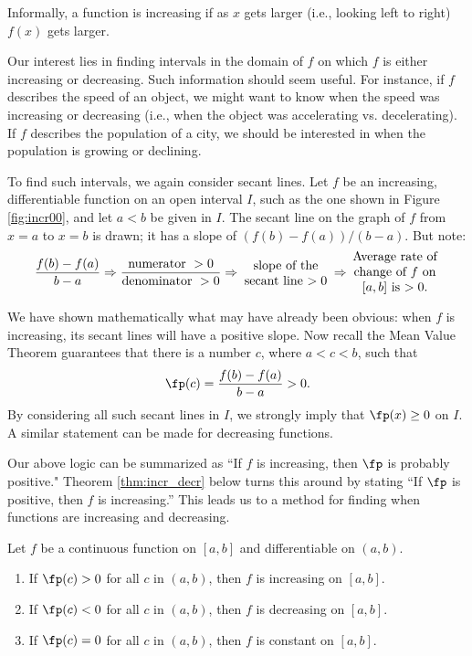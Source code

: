 Informally, a function is increasing if as $x$ gets larger (i.e., looking left to right) $f(x)$ gets larger.

Our interest lies in finding intervals in the domain of $f$ on which $f$ is either increasing or decreasing. Such information should seem useful. For instance, if $f$ describes the speed of an object, we might want to know when the speed was increasing or decreasing (i.e., when the object was accelerating vs. decelerating). If $f$ describes the population of a city, we should be interested in when the population is growing or declining.

To find such intervals, we again consider secant lines. Let $f$ be an increasing, differentiable function on an open interval $I$, such as the one shown in Figure \ref{fig:incr00}, and let $a<b$ be given in $I$. The secant line on the graph of $f$ from $x=a$ to $x=b$ is drawn; it has a slope of $(f(b)-f(a))/(b-a)$. But note:
\[
\frac{f(b)-f(a)}{b-a} \Rightarrow \frac{\text{numerator }>0}{\text{denominator } >0} \Rightarrow \parbox{70pt}{\centering slope of the secant line $>0$} \Rightarrow \parbox{70pt}{\centering Average rate of change of $f$ on $[a,b]$ is $>0$.}
\]


We have shown mathematically what may have already been obvious: when $f$ is increasing, its secant lines will have a positive slope. Now recall the Mean Value Theorem guarantees that there is a number $c$, where $a<c<b$, such that 
\[
\fp(c) = \frac{f(b)-f(a)}{b-a}>0.
\]
 By considering all such secant lines in $I$, we strongly imply that $\fp(x) \geq 0$ on $I$. A similar statement can be made for decreasing functions.

Our above logic can be summarized as ``If $f$ is increasing, then $\fp$ is probably  positive." Theorem \ref{thm:incr_decr} below turns this around by stating ``If $\fp$ is positive, then $f$ is increasing.'' This leads us to a method for finding when functions are increasing and decreasing.

%
{Let $f$ be a continuous function on $[a,b]$ and differentiable on $(a,b)$.
\begin{enumerate}
\item		If $\fp(c) > 0$ for all $c$ in $(a,b)$, then $f$ is increasing on $[a,b]$.
\item		If $\fp(c) <0$ for all $c$ in $(a,b)$, then $f$ is decreasing on $[a,b]$.
\item		If $\fp(c) =0$ for all $c$ in $(a,b)$, then $f$ is constant on $[a,b]$.
\end{enumerate}
}

